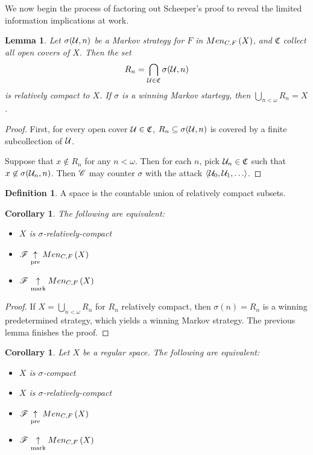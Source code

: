 \documentclass{amsart}
\newtheorem{lemma}[theorem]{Lemma}
\newtheorem{corollary}[theorem]{Corollary}
\theoremstyle{definition}
\newtheorem{definition}[theorem]{Definition}
\begin{document}
We now begin the process of factoring out Scheeper's proof to reveal the
limited information implications at work.

\begin{lemma}
  Let \(\sigma(\mathcal{U}, n)\) be a Markov strategy for \(F\) in
  \(Men_{C,F}\left({X}\right)\), and \(\mathfrak{C}\) collect all open covers of \(X\). Then the
  set
    \[
      R_n = \bigcap_{\mathcal{U}\in\mathfrak{C}} \sigma(\mathcal{U},n)
    \]
  is relatively compact to \(X\). If \(\sigma\) is a winning
  Markov startegy, then \(\bigcup_{n<\omega} R_n = X\).
\end{lemma}

\begin{proof}
  First, for every open cover \(\mathcal{U}\in\mathfrak C\),
  \(R_n\subseteq\sigma(\mathcal{U},n)\) is covered by a finite subcollection of \(\mathcal{U}\).

  Suppose that \(x \not\in R_n\) for any \(n<\omega\). Then for each \(n\),
  pick \(\mathcal{U}_n\in\mathfrak{C}\) such that \(x\not\in \sigma(\mathcal{U}_n,n)\). Then
  \(\mathscr{C}\) may counter \(\sigma\) with the attack \(\<\mc U_0,\mc U_1,\dots\>\).
\end{proof}

\begin{definition}
  A  space is the countable union of
  relatively compact subsets.
\end{definition}

\begin{corollary}
  The following are equivalent:
  \begin{itemize}
    \item \(X\) is \(\sigma\)-relatively-compact
    \item \(\mathscr{F} \underset{\text{pre}}{\uparrow} Men_{C,F}\left({X}\right)\)
    \item \(\mathscr{F} \underset{\text{mark}}{\uparrow} Men_{C,F}\left({X}\right)\)
  \end{itemize}
\end{corollary}

\begin{proof}
  If \(X=\bigcup_{n<\omega} R_n\) for \(R_n\) relatively compact, then
  \(\sigma(n)=R_n\) is a winning predetermined strategy, which yields a
  winning Markov strategy. The previous lemma finishes the proof.
\end{proof}

\begin{corollary}
  Let \(X\) be a regular space. The following are equivalent:
  \begin{itemize}
    \item \(X\) is \(\sigma\)-compact
    \item \(X\) is \(\sigma\)-relatively-compact
    \item \(\mathscr{F} \underset{\text{pre}}{\uparrow} Men_{C,F}\left({X}\right)\)
    \item \(\mathscr{F} \underset{\text{mark}}{\uparrow} Men_{C,F}\left({X}\right)\)
  \end{itemize}
\end{corollary}
\end{document}
